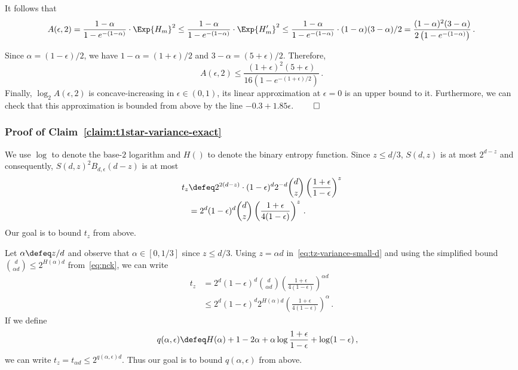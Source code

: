   It follows that 
  $$
    A(\epsilon, 2) 
    = \frac{1 - \alpha}{1 - e^{-(1 - \alpha)}} \cdot \Exp {H_m}^2
    \leq \frac{1 - \alpha}{1 - e^{-(1 - \alpha)}} \cdot \Exp {H'_m}^2
    \leq \frac{1 - \alpha}{1 - e^{-(1 - \alpha)}} \cdot (1-\alpha) (3 - \alpha)/2
    = \frac{(1 - \alpha)^2 (3 - \alpha)}{2 \left( 1 - e^{-(1 - \alpha)} \right)}
    \,.
  $$
  
  Since $\alpha = (1 - \epsilon)/2$, 
  we have 
  $1 - \alpha = (1 + \epsilon)/2$ 
  and 
  $3 - \alpha = (5 + \epsilon)/2$. 
  Therefore,
  $$
    A(\epsilon, 2) 
    \leq 
    \frac{(1 + \epsilon)^2 (5 + \epsilon)}{16 \left( 1 - e^{-(1 + \epsilon)/2} \right)}
    \,.
  $$
  Finally, $\log_2 A(\epsilon, 2)$ is concave-increasing in $\epsilon \in (0, 1)$, 
  its linear approximation at $\epsilon = 0$ 
  is an upper bound to it. 
  Furthermore, we can check that this approximation is 
  bounded from above by the line $- 0.3 + 1.85 \epsilon$.
  \hfill$\qed$



\subsubsection{Proof of Claim~\ref{claim:t1star-variance-exact}}
  We use $\log$ to denote the base-$2$ logarithm and $H()$ to denote the binary entropy function. 
  Since $z \leq d/3$, $S(d,z)$ is at most $2^{d-z}$ and consequently, 
  $S(d, z)^2 B_{d, \epsilon}(d-z)$ is at most
  \begin{align}\label{eq:tz-variance-small-d}
  t_z&\defeq 2^{2(d-z)} \cdot (1-\epsilon)^d 2^{-d} {d \choose z}  \left(\frac{1+\epsilon}{1-\epsilon}\right)^{z} \nonumber \\
  &= 2^d(1-\epsilon)^d {d \choose z} \left(\frac{1+\epsilon}{4(1-\epsilon)}\right)^{z}\,.
  \end{align}
  Our goal is to bound $t_z$ from above. 

  Let $\alpha \defeq z/d$ and observe that $\alpha \in [0, 1/3]$ since $z \leq d/3$.
  Using $z = \alpha d$ in~\eqref{eq:tz-variance-small-d} and 
  using the simplified bound $\binom{d}{\alpha d} \leq 2^{H(\alpha)d}$ from~\eqref{eq:nck}, 
  we can write
  \begin{align*}
  t_z
  &= 2^{d}(1-\epsilon)^d {d \choose \alpha d} \left(\frac{1+\epsilon}{4(1-\epsilon)}\right)^{\alpha d} \\
  &\leq 2^d
  (1-\epsilon)^d 
  2^{H(\alpha)d} 
  \left(\frac{1+\epsilon}{4(1-\epsilon)}\right)^{\alpha}
  \,.
  \end{align*}
  If we define 
  \begin{align*}
  q(\alpha, \epsilon)
  &\defeq H(\alpha)+1-2\alpha+ \alpha \log \frac{1+\epsilon}{1-\epsilon}+\log(1-\epsilon)
  \,,
  \end{align*}
  we can write $t_z = t_{\alpha d} \leq 2^{q(\alpha, \epsilon)d}$. 
  Thus our goal is to bound $q(\alpha, \epsilon)$ from above. 

